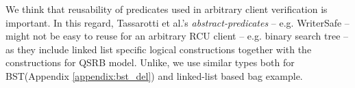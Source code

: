  We think that reusability of predicates used in arbitrary client verification is important. In this regard, Tassarotti et al.'s \textit{abstract-predicates} -- e.g. WriterSafe -- might not be easy to reuse for an arbitrary RCU client -- e.g. binary search tree -- as they include linked list specific logical constructions together with the constructions for QSRB model. Unlike, we use similar types both for BST(Appendix \ref{appendix:bst_del}) and linked-list based bag example. 
